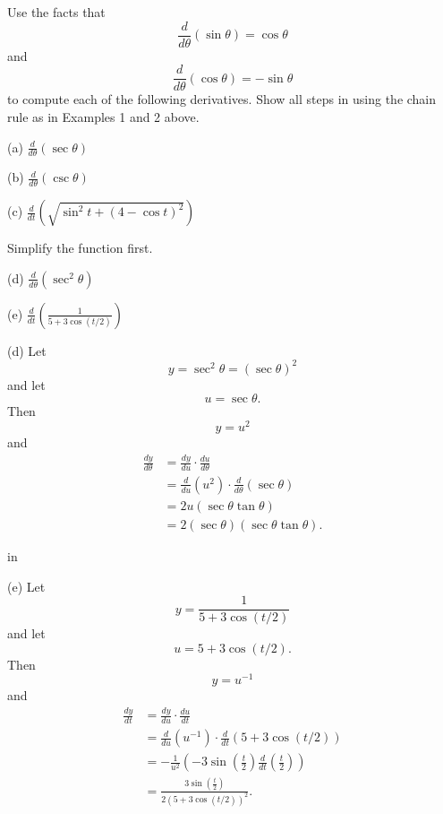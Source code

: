 \documentclass{ximera}
\newcommand{\pskip}{\vskip 0.1 in}
\begin{document}
\begin{exercise}  \label{ExLdfsdfll}
Use the facts that 
\[
\frac{d}{d\theta} \left( \sin\theta \right) = \cos\theta
\]
and
\[
\frac{d}{d\theta} \left( \cos\theta \right) = -\sin\theta
\]
to compute each of the following derivatives. Show all steps in using the chain rule as in Examples 1 and 2 above.

(a) $\frac{d}{d\theta} \left( \sec\theta \right)$

(b) $\frac{d}{d\theta} \left( \csc\theta \right)$

(c) $\frac{d}{dt} \left( \sqrt{\sin^2 t + (4-\cos t )^2} \right)$  

\begin{hint}
Simplify the function first.
\end{hint}

(d)  $\frac{d}{d\theta} \left( \sec^2\theta \right)$

(e) $\frac{d}{dt} \left( \frac{1}{5+3\cos (t/2)}   \right)$

\begin{explanation}
(d) Let 
\[
   y = \sec^2\theta = (\sec\theta)^2 
\]
and let 
\[
    u = \sec\theta .
\]
Then 
\[
  y  =u^2
\]
and
\begin{align*}
   \frac{dy}{d\theta}   &= \frac{dy}{du} \cdot \frac{du}{d\theta} \\
                                &= \frac{d}{du}\left( u^2 \right) \cdot \frac{d}{d\theta} \left( \sec\theta \right) \\
                                &= 2u ( \sec\theta \tan\theta) \\
                                &= 2 (\sec\theta) ( \sec\theta \tan\theta) .
\end{align*}

\pskip

(e) Let 
\[
   y = \frac{1}{5+3\cos(t/2)}%
\]
and let 
\[
    u = 5+3\cos(t/2) .
\]
Then 
\[
  y  =u^{-1}
\]
and
\begin{align*}
   \frac{dy}{dt}   &= \frac{dy}{du} \cdot \frac{du}{dt} \\
                                &= \frac{d}{du}\left( u^{-1} \right) \cdot \frac{d}{dt} \left( 5+3\cos(t/2) \right) \\
                                &= -\frac{1}{u^2} \left( -3 \sin \left(\frac{t}{2}\right) \frac{d}{dt}\left( \frac{t}{2}\right)\right) \\
                                &= \frac{3\sin \left(\frac{t}{2}\right)}{2(5+3\cos(t/2))^2} .
\end{align*}
\end{explanation}

\end{exercise}
\end{document}
